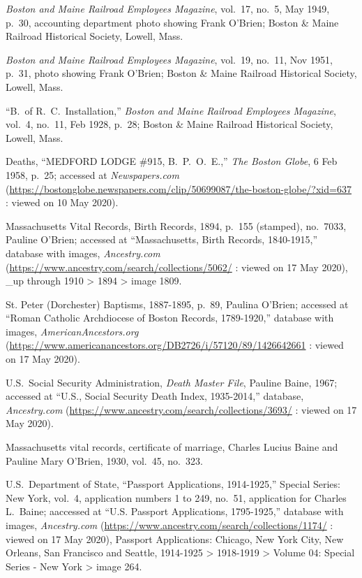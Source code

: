 \begin{thebibliography}{999}
\textit{Boston and Maine Railroad Employees Magazine}, vol.\ 17, no.\ 5, May 1949, p.\ 30, accounting department photo showing Frank O'Brien; Boston \& Maine Railroad Historical Society, Lowell, Mass.

\textit{Boston and Maine Railroad Employees Magazine}, vol.\ 19, no.\ 11, Nov 1951, p.\ 31, photo showing Frank O'Brien; Boston \& Maine Railroad Historical Society, Lowell, Mass.

``B.\ of R.\ C.\ Installation,'' \textit{Boston and Maine Railroad Employees Magazine}, vol.\ 4, no.\ 11, Feb 1928, p.\ 28; Boston \& Maine Railroad Historical Society, Lowell, Mass.

Deaths, ``MEDFORD LODGE \#915, B.\ P.\ O.\ E.,'' \textit{The Boston Globe}, 6 Feb 1958, p.\ 25; accessed at \textit{Newspapers.com} (\url{https://bostonglobe.newspapers.com/clip/50699087/the-boston-globe/?xid=637} : viewed on 10 May 2020).


Massachusetts Vital Records, Birth Records, 1894, p.\ 155 (stamped), no.\ 7033, Pauline O'Brien; accessed at ``Massachusetts, Birth Records, 1840-1915,'' database with images, \textit{Ancestry.com} (\url{https://www.ancestry.com/search/collections/5062/} : viewed on 17 May 2020), \_up through 1910 > 1894 > image 1809.

St. Peter (Dorchester) Baptisms, 1887-1895, p.\ 89, Paulina O'Brien; accessed at ``Roman Catholic Archdiocese of Boston Records, 1789-1920,'' database with images, \textit{AmericanAncestors.org} (\url{https://www.americanancestors.org/DB2726/i/57120/89/1426642661} : viewed on 17 May 2020).

U.S.\ Social Security Administration, \textit{Death Master File}, Pauline Baine, 1967; accessed at ``U.S., Social Security Death Index, 1935-2014,'' database, \textit{Ancestry.com} (\url{https://www.ancestry.com/search/collections/3693/} : viewed on 17 May 2020).


Massachusetts vital records, certificate of marriage, Charles Lucius Baine and Pauline Mary O'Brien, 1930, vol.\ 45, no.\ 323.

U.S.\ Department of State, ``Passport Applications, 1914-1925,'' Special Series: New York, vol.\ 4, application numbers 1 to 249, no.\ 51, application for Charles L.\ Baine; aaccessed at ``U.S. Passport Applications, 1795-1925,'' database with images, \textit{Ancestry.com} (\url{https://www.ancestry.com/search/collections/1174/} : viewed on 17 May 2020), Passport Applications: Chicago, New York City, New Orleans, San Francisco and Seattle, 1914-1925 > 1918-1919 > Volume 04: Special Series - New York > image 264.


\end{thebibliography}

